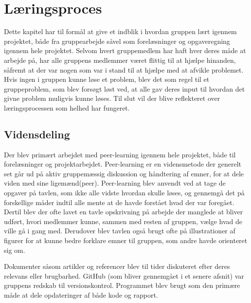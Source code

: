 \chapter{Læringsproces}\label{Laeringsproces}
Dette kapitel har til formål at give et indblik i hvordan gruppen lært igennem projektet, både fra gruppearbejde såvel som forelæsninger og opgaveregning igennem hele projektet. Selvom hvert gruppemedlem har haft hver deres måde at arbejde på, har alle gruppens medlemmer været flittig til at hjælpe hinanden, såfremt at der var nogen som var i stand til at hjælpe med at afvikle problemet. Hvis ingen i gruppen kunne løse et problem, blev det som regel til et gruppeproblem, som blev forsøgt løst ved, at alle gav deres input til hvordan det givne problem muligvis kunne løses. Til slut vil der blive reflekteret over læringsprocessen som helhed har fungeret.

\section{Vidensdeling}\label{Vidensdeling}
Der blev primært arbejdet med peer-learning igennem hele projektet, både til forelæsninger og projektarbejdet. Peer-learning er en vidensmetode der generelt set går ud på aktiv gruppemæssig diskussion og håndtering af emner, for at dele viden med sine ligemænd(peer). Peer-learning blev anvendt ved at tage de opgaver på tavlen, som ikke alle vidste hvordan skulle løses, og gennemgå det på forskellige måder indtil alle mente at de havde forstået hvad der var foregået. Dertil blev der ofte lavet en tavle opskrivning på arbejde der manglede at bliver udført, hvori medlemmer kunne, sammen med resten af gruppen, vælge hvad de ville gå i gang med. Derudover blev tavlen også brugt ofte på illustrationer af figurer for at kunne bedre forklare emner til gruppen, som andre havde orienteret sig om.

\vspace{5mm}

Dokumenter såsom artikler og referencer blev til tider diskuteret efter deres relevans eller brugbarhed. GitHub (som bliver gennemgået i et senere afsnit) var gruppens redskab til versionskontrol. Programmet blev brugt som den primære måde at dele opdateringer af både kode og rapport.

